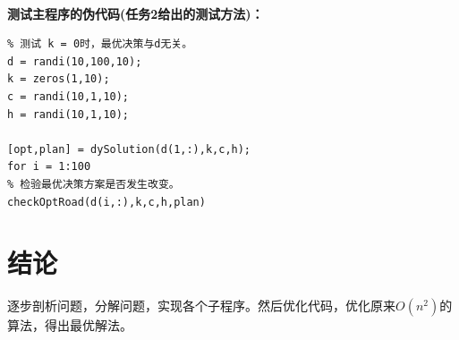 \documentclass[UTF8]{ctexart}
\begin{document}
~\\

\textbf{测试主程序的伪代码(任务2给出的测试方法)：}
\begin{lstlisting}
% 测试 k = 0时，最优决策与d无关。
d = randi(10,100,10);
k = zeros(1,10);
c = randi(10,1,10);
h = randi(10,1,10);
 
[opt,plan] = dySolution(d(1,:),k,c,h);
for i = 1:100
% 检验最优决策方案是否发生改变。
checkOptRoad(d(i,:),k,c,h,plan)
\end{lstlisting}


\section{结论}
逐步剖析问题，分解问题，实现各个子程序。然后优化代码，优化原来\(O(n^2)\)的算法，得出最优解法。
\end{document}
